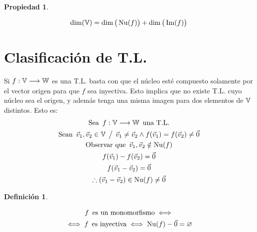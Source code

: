 \documentclass[a5paper,12pt,twoside]{book}
\newtheorem{defn}{{Definición}}[chapter]
\newtheorem{prop}{{Propiedad}}[chapter]
\begin{document}
\begin{mdframed}[style=MyFrame1]
    \begin{prop}
    \end{prop}
    \begin{equation*}
        \operatorname{dim}(\mathbb{V}) = \operatorname{dim} \big(\operatorname{Nu}(f)\big) + \operatorname{dim} \big(\operatorname{Im}(f)\big)
    \end{equation*}
\end{mdframed}


\section{Clasificación de T.L.}

Si $f: \mathbb{V} \longrightarrow \mathbb{W}$ es una T.L. basta con que el núcleo esté compuesto solamente por el vector origen para que $f$ sea inyectiva. Esto implica que no existe T.L. cuyo núcleo sea el origen, y además tenga una misma imagen para dos elementos de $\mathbb{V}$ distintos. Esto es:
\begin{gather*}
    \textrm{Sea} \enspace f: \mathbb{V} \longrightarrow \mathbb{W} \enspace \textrm{una T.L.}
    \\
    \textrm{Sean} \enspace \Vec{v}_1,\Vec{v}_2 \in \mathbb{V} \hspace{1ex} \big/ \hspace{1ex} \Vec{v}_1 \neq \Vec{v}_2 \land f(\Vec{v}_1) = f(\Vec{v}_2) \neq \Vec{0}
    \\
    \textrm{Observar que} \enspace \Vec{v}_1,\Vec{v}_2 \notin \operatorname{Nu}(f)
    \\
    f(\Vec{v}_1) - f(\Vec{v}_2) = \Vec{0}
    \\
    f(\Vec{v}_1 - \Vec{v}_2) = \Vec{0}
    \\
    \therefore \left( \Vec{v}_1 - \Vec{v}_2 \right) \in \operatorname{Nu}(f) \neq \Vec{0}
\end{gather*}


\begin{mdframed}[style=MyFrame1]
    \begin{defn}
    \end{defn}
    \begin{multline*}
        f \enspace \textrm{es un monomorfismo} \iff
        \\
        \iff f  \enspace \textrm{es inyectiva}
        \iff \operatorname{Nu}(f) - \Vec{0} = \varnothing
    \end{multline*}
\end{mdframed}
\end{document}
